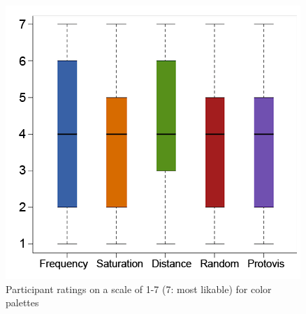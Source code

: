 \begin{figure}
\label{likability}
\centering
\includegraphics[scale=0.7]{likability_algorithm.png}
\caption{Participant ratings on a scale of 1-7 (7: most likable) for color palettes}
\end{figure}